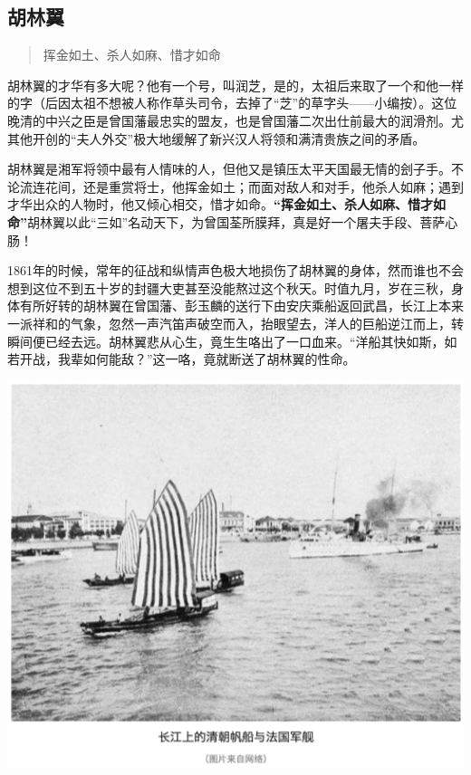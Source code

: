 \documentclass[]{book}
\begin{document}
\subsection{胡林翼}

\begin{quote}
挥金如土、杀人如麻、惜才如命
\end{quote}

胡林翼的才华有多大呢？他有一个号，叫润芝，是的，太祖后来取了一个和他一样的字（后因太祖不想被人称作草头司令，去掉了``芝''的草字头------小编按）。这位晚清的中兴之臣是曾国藩最忠实的盟友，也是曾国藩二次出仕前最大的润滑剂。尤其他开创的``夫人外交''极大地缓解了新兴汉人将领和满清贵族之间的矛盾。

胡林翼是湘军将领中最有人情味的人，但他又是镇压太平天国最无情的刽子手。不论流连花间，还是重赏将士，他挥金如土；而面对敌人和对手，他杀人如麻；遇到才华出众的人物时，他又倾心相交，惜才如命。\textbf{``挥金如土、杀人如麻、惜才如命''}胡林翼以此``三如''名动天下，为曾国荃所膜拜，真是好一个屠夫手段、菩萨心肠！

1861年的时候，常年的征战和纵情声色极大地损伤了胡林翼的身体，然而谁也不会想到这位不到五十岁的封疆大吏甚至没能熬过这个秋天。时值九月，岁在三秋，身体有所好转的胡林翼在曾国藩、彭玉麟的送行下由安庆乘船返回武昌，长江上本来一派祥和的气象，忽然一声汽笛声破空而入，抬眼望去，洋人的巨船逆江而上，转瞬间便已经去远。胡林翼悲从心生，竟生生咯出了一口血来。``洋船其快如斯，如若开战，我辈如何能敌？''这一咯，竟就断送了胡林翼的性命。

\includegraphics[width=6.67in]{images/his1}
\end{document}
